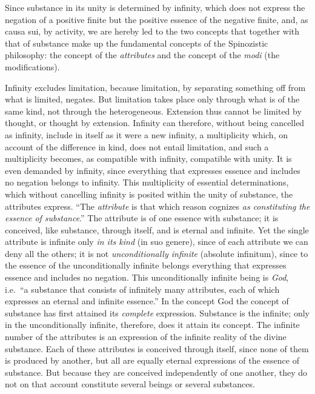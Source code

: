Since substance in its unity is determined by infinity, which does not
express the negation of a positive finite but the positive essence of
the negative finite, and, as causa sui, by activity, we are hereby led
to the two concepts that together with that of substance make up the
fundamental concepts of the Spinozistic philosophy: the concept of the
\emph{attributes} and the concept of the \emph{modi} (the
modifications).

Infinity excludes limitation, because limitation, by separating
something off from what is limited, negates. But limitation takes place
only through what is of the same kind, not through the heterogeneous.
Extension thus cannot be limited by thought, or thought by extension.
Infinity can therefore, without being cancelled as infinity, include in
itself as it were a new infinity, a multiplicity which, on account of
the difference in kind, does not entail limitation, and such a
multiplicity becomes, as compatible with infinity, compatible with
unity. It is even demanded by infinity, since everything that
expresses essence and includes no negation belongs to infinity. This
multiplicity of essential determinations, which without cancelling
infinity is posited within the unity of substance, the attributes
express. ``The \emph{attribute} is that which reason cognizes
\emph{as constituting} \emph{the essence of substance}.'' The attribute
is of one essence with substance; it is conceived, like substance,
through itself, and is eternal and infinite. Yet the single attribute is
infinite only \emph{in its kind} (in suo genere), since of each
attribute we can deny all the others; it is not
\emph{unconditionally infinite} (absolute infinitum), since to the
essence of the unconditionally infinite belongs everything that
expresses essence and includes no negation. This unconditionally
infinite being is \emph{God}, i.e.\ ``a substance that consists of
infinitely many attributes, each of which expresses an eternal and
infinite essence.'' In the concept God the concept of substance has
first attained its \emph{complete} expression. Substance is the
infinite; only in the unconditionally infinite, therefore, does it
attain its concept. The infinite number of the attributes is an
expression of the infinite reality of the divine substance. Each of
these attributes is conceived through itself, since none of them is
produced by another, but all are equally eternal expressions of the
essence of substance. But because they are conceived independently of
one another, they do not on that account constitute several beings or
several substances.

